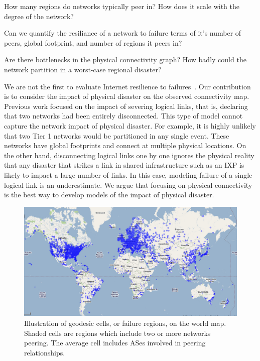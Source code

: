 \eat{
}

 How many regions do networks typically peer in? How does it scale with the degree of the network?

 Can we quantify the resiliance of a network to failure terms of it's number of peers, global footprint, and number of regions it peers in?

 Are there bottlenecks in the physical connectivity graph? How badly could the network partition in a worst-case regional disaster?

We are not the first to evaluate Internet resilience to
failures~\cite{michigan, measuringresilience, resilience-under-BGP,
resilience-complex-networks}.  Our contribution is to consider the impact of physical
disaster on the observed connectivity map.  Previous work focused on
the impact of severing logical links, that is, declaring that two networks had
been entirely disconnected.  This type of model cannot capture the network impact
of physical disaster.  For example, it is highly unlikely that two Tier
1 networks would be partitioned in any single event.  These networks have
global footprints and connect at multiple physical locations.
  On the other hand, disconnecting logical links
one by one ignores the physical reality that any disaster that strikes a link
in shared infrastructure such as an IXP is likely to impact a large number of
links.  In this case, modeling failure of a single logical link is an
underestimate.  We argue that focusing on physical connectivity is the best way to
develop models of the impact of physical disaster. 
 
\begin{figure}[htb]
\centering
\includegraphics[width=6in]{world_map.jpg}
\caption[]{\label{fig:worldmap}  Illustration of geodesic cells, or failure regions, on the world map. Shaded cells are regions which include two or more networks peering. The average cell includes  ASes involved in  peering relationships.} 
\end{figure}



